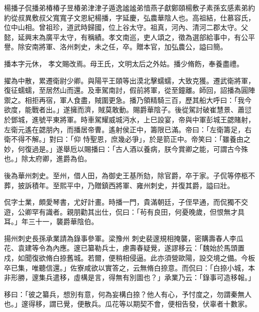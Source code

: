 
\begin{pinyinscope}

 楊播子侃播弟椿椿子昱椿弟津津子遁逸謐謐弟愔燕子獻鄭頤楊敷子素孫玄感素弟約約從叔異敷叔父寬寬子文恩紀楊播，字延慶，弘農華陰人也。高祖結，仕慕容氏，位中山相。曾祖珍，道武時歸國，位上谷太守。祖真，河內、清河二郡太守。父懿，延興末為廣平太守，有稱績。孝文南巡，吏人頌之，徵為選部給事中，有公平譽。除安南將軍、洛州刺史，未之任，卒。贈本官，加弘農公，謚曰簡。



 播本字元休，
 孝文賜改焉。母王氏，文明太后之外姑。播少脩飭，奉養盡禮。



 擢為中散，累遷衛尉少卿。與陽平王頤等出漠北擊蠕蠕，大致克獲。遷武衛將軍，復征蠕蠕，至居然山而還。及車駕南討，假前將軍，從至鐘離。師回，詔播為圓陣禦之。相拒再宿，軍人食盡，賊圍更急。播乃領精騎三百，歷其船大呼曰：「我今欲度，能戰者出。」遂擁而濟，賊莫敢動。賜爵華陰子。後從駕討破崔慧景、蕭愆於鄧城，進號平東將軍。時車駕耀威城沔水，上巳設宴，帝與中軍彭城王勰賭射，左衛元遙在勰朋內，而播居帝曹。遙射侯正中，籌限已滿。帝曰：「左衛籌足，右衛不得不解。」對曰：「仰
 恃聖恩，庶幾必爭」，於是箭正中。帝笑曰：「雖養由之妙，何復過是。」遂舉卮以賜播曰：「古人酒以養病，朕今賞卿之能，可謂古今殊也。」除太府卿，進爵為伯。



 後為華州刺史。至州，借人田，為御史王基所劾，除官爵，卒于家。子侃等停柩不葬，披訴積年。至熙平中，乃贈鎮西將軍、雍州刺史，并復其爵，謚曰壯。



 侃字士業，頗愛琴書，尤好計畫。時播一門，貴滿朝廷，子侄早通，而侃獨不交遊，公卿罕有識者。親朋勸其出仕，侃曰：「茍有良田，何憂晚歲，但恨無才具耳。」年三十一，襲爵華陰伯。



 揚州刺史長孫承業請為錄事參軍。梁豫州
 刺史裴邃規相掩襲，密購壽春人李瓜花、袁建等令為內應。邃已纂勒兵士，慮壽春疑覺，遂謬移云：「魏始於馬頭置戍，如聞復欲脩白捺舊城。若爾，便稍相侵逼。此亦須營歐陽，設交境之備。今板卒已集，唯聽信還。」佐寮咸欲以實答之，云無脩白捺意。而侃曰：「白捺小城，本非形勝，邃集兵遣移，虛構是言，得無有別圖也？」承業乃云：「錄事可造移報。」



 移曰：「彼之纂兵，想別有意，何為妄構白捺？他人有心，予忖度之，勿謂秦無人也。」邃得移，謂已覺，便散兵。瓜花等以期契不會，便相告發，伏辜者十數家。




\end{pinyinscope}
